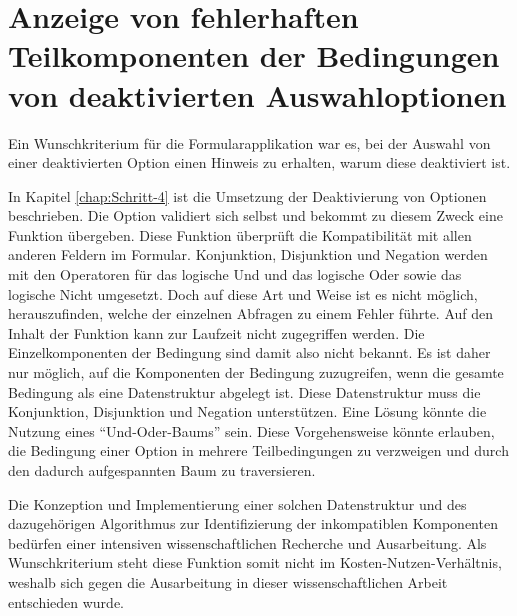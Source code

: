 \clearpage
\section{Anzeige von fehlerhaften Teilkomponenten der Bedingungen von deaktivierten Auswahloptionen}
\label{sec:Anzeige-von-fehlerhaften-Teilkomponenten-der-Bedingungen-von-deaktivierten-Auswahloptionen}


Ein Wunschkriterium für die Formularapplikation war es,
bei der Auswahl von einer deaktivierten Option einen Hinweis zu erhalten,
warum diese deaktiviert ist.

In Kapitel \ref{chap:Schritt-4} ist die Umsetzung der Deaktivierung von Optionen beschrieben.
Die Option validiert sich selbst und bekommt zu diesem Zweck eine Funktion übergeben. Diese Funktion überprüft die Kompatibilität mit allen anderen Feldern im Formular.
Konjunktion, Disjunktion und Negation werden mit den Operatoren für das logische Und und das logische Oder sowie das logische Nicht umgesetzt.
Doch auf diese Art und Weise ist es nicht möglich,
herauszufinden,
welche der einzelnen Abfragen zu einem Fehler führte.
Auf den Inhalt der Funktion kann zur Laufzeit nicht zugegriffen werden.
Die Einzelkomponenten der Bedingung sind damit also nicht bekannt. 
Es ist daher nur möglich,
auf die Komponenten der Bedingung zuzugreifen,
wenn die gesamte Bedingung als eine Datenstruktur abgelegt ist.
Diese Datenstruktur muss die Konjunktion, Disjunktion und Negation unterstützen.
Eine Lösung könnte die Nutzung eines \enquote{Und-Oder-Baums} sein.
Diese Vorgehensweise könnte erlauben, die Bedingung einer Option in mehrere Teilbedingungen zu verzweigen und durch den dadurch aufgespannten Baum zu traversieren.


Die Konzeption und Implementierung einer solchen Datenstruktur und des dazugehörigen Algorithmus zur Identifizierung der inkompatiblen Komponenten bedürfen einer intensiven wissenschaftlichen Recherche und Ausarbeitung.
Als Wunschkriterium steht diese Funktion somit nicht im Kosten-Nutzen-Verhältnis, weshalb sich gegen die Ausarbeitung in dieser wissenschaftlichen Arbeit entschieden wurde.

